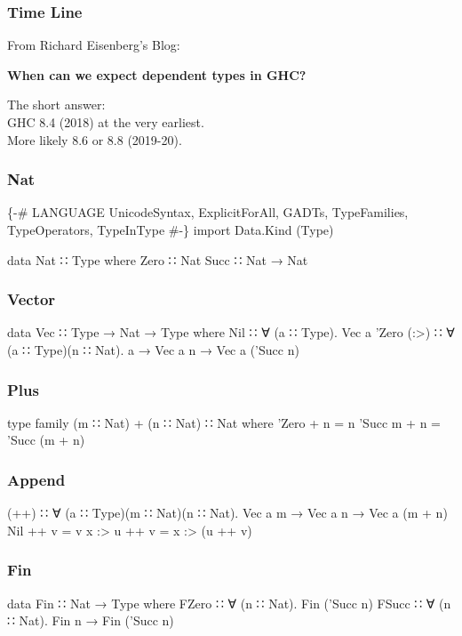 \documentclass{beamer}
\begin{document}
\begin{frame}\frametitle{Time Line}
From Richard Eisenberg's Blog:

\bigskip

\textbf{When can we expect dependent types in GHC?}

\bigskip

The short answer:\\
GHC 8.4 (2018) at the very earliest.\\
More likely 8.6 or 8.8 (2019-20).
\end{frame}

\begin{frame}[fragile]\frametitle{Nat}
\begin{semiverbatim}
\{-# LANGUAGE UnicodeSyntax, ExplicitForAll, GADTs,
              TypeFamilies, TypeOperators, TypeInType #-\}
import Data.Kind (Type)

data Nat ∷ Type where
  Zero ∷ Nat
  Succ ∷ Nat → Nat
\end{semiverbatim}
\end{frame}

\begin{frame}[fragile]\frametitle{Vector}
\begin{semiverbatim}
data Vec ∷ Type → Nat → Type where
  Nil  ∷ ∀ (a ∷ Type). Vec a 'Zero
  (:>) ∷ ∀ (a ∷ Type)(n ∷ Nat).
    a → Vec a n → Vec a ('Succ n)
\end{semiverbatim}
\end{frame}

\begin{frame}[fragile]\frametitle{Plus}
\begin{semiverbatim}
type family (m ∷ Nat) + (n ∷ Nat) ∷ Nat where
  'Zero   + n = n
  'Succ m + n = 'Succ (m + n)
\end{semiverbatim}
\end{frame}

\begin{frame}[fragile]\frametitle{Append}
\begin{semiverbatim}
(++) ∷ ∀ (a ∷ Type)(m ∷ Nat)(n ∷ Nat).
       Vec a m → Vec a n → Vec a (m + n)
Nil    ++ v = v
x :> u ++ v = x :> (u ++ v)
\end{semiverbatim}
\end{frame}

\begin{frame}[fragile]\frametitle{Fin}
\begin{semiverbatim}
data Fin ∷ Nat → Type where
  FZero ∷ ∀ (n ∷ Nat).         Fin ('Succ n)
  FSucc ∷ ∀ (n ∷ Nat). Fin n → Fin ('Succ n)
\end{semiverbatim}
\end{frame}
\end{document}
